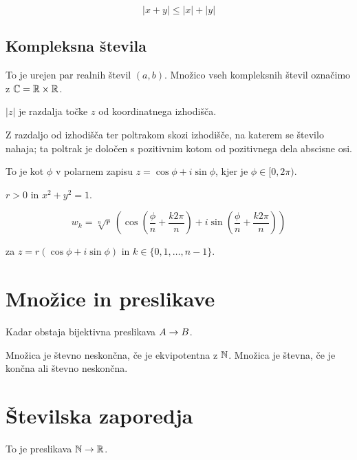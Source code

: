 
\[
	\left|x+y\right| \le \left|x\right| + \left|y\right|
\]

\subsection{Kompleksna števila}


To je urejen par realnih števil $(a,b)$. Množico vseh kompleksnih števil označimo z $\mathbb{C} = \mathbb{R} \times \mathbb{R}$.


$|z|$ je razdalja točke $z$ od koordinatnega izhodišča.


Z razdaljo od izhodišča ter poltrakom skozi izhodišče, na katerem se število nahaja; ta poltrak je določen s pozitivnim kotom od pozitivnega dela abscisne osi.


To je kot $\phi$ v polarnem zapisu $z = \cos \phi + i \sin \phi$, kjer je $\phi \in [0, 2\pi)$.


$r>0$ in $x^2 + y^2 = 1$.


\[
	w_k = \sqrt[n]{r} \,(\cos (\frac{\phi}{n} + \frac{k2\pi}{n}) + i \sin(\frac{\phi}{n} + \frac{k2\pi}{n}))
\]

za $z = r(\cos\phi + i\sin\phi)$ in $k \in \{0, 1, \ldots, n-1\}$.

\section{Množice in preslikave}


Kadar obstaja bijektivna preslikava $A \to B$.


Množica je števno neskončna, če je ekvipotentna z $\mathbb{N}$. Množica je števna, če je končna ali števno neskončna.

\section{Številska zaporedja}


To je preslikava $\mathbb{N} \to \mathbb{R}$.